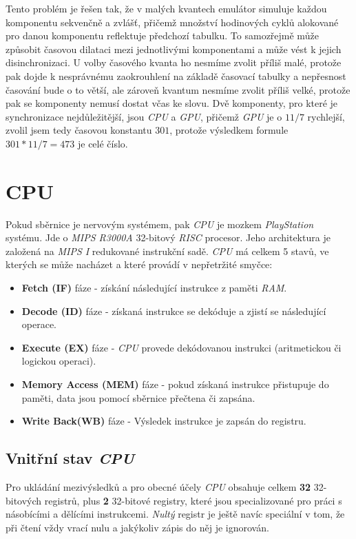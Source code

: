 Tento problém je řešen tak, že v malých kvantech emulátor simuluje každou komponentu sekvenčně a zvlášť,
přičemž množství hodinových cyklů alokované pro danou komponentu reflektuje předchozí tabulku.
To samozřejmě může způsobit časovou dilataci mezi jednotlivými komponentami a může vést k jejich
disinchronizaci. U volby časového kvanta ho nesmíme zvolit příliš malé, protože pak dojde k nesprávnému
zaokrouhlení na základě časovací tabulky a nepřesnost časování bude o to větší, ale zároveň kvantum nesmíme zvolit příliš velké, protože pak
se komponenty nemusí dostat včas ke slovu. Dvě komponenty, pro které je synchronizace nejdůležitější,
jsou \textit{CPU} a \textit{GPU}, přičemž \textit{GPU} je o $11/7$ rychlejší, zvolil jsem tedy časovou konstantu $301$,
protože výsledkem formule $301*11/7=473$ je celé číslo.

\section{CPU}

Pokud sběrnice je nervovým systémem, pak \textit{CPU} je mozkem \textit{PlayStation} systému. Jde
o \textit{MIPS R3000A} 32-bitový \textit{RISC} procesor. Jeho architektura je založená na \textit{MIPS I} redukované instrukční sadě.
\textit{CPU} má celkem 5 stavů, ve kterých se může nacházet a které provádí v nepřetržité smyčce:

\begin{itemize}
    \item{\textbf{Fetch (IF)} fáze - získání následující instrukce z paměti \textit{RAM}.}
    \item{\textbf{Decode (ID)} fáze - získaná instrukce se dekóduje a zjistí se následující operace.}
    \item{\textbf{Execute (EX)} fáze - \textit{CPU} provede dekódovanou instrukci (aritmetickou či logickou operaci).}
    \item{\textbf{Memory Access (MEM)} fáze - pokud získaná instrukce přistupuje do paměti, data jsou pomocí sběrnice přečtena či zapsána.}
    \item{\textbf{Write Back(WB)} fáze - Výsledek instrukce je zapsán do registru.}
\end{itemize}

\subsection{Vnitřní stav \textit{CPU}}

Pro ukládání mezivýsledků a pro obecné účely \textit{CPU} obsahuje celkem \textbf{32} 32-bitových registrů, plus \textbf{2} 32-bitové registry, které
jsou specializované pro práci s násobícími a dělícími instrukcemi. \textit{Nultý} registr je ještě navíc speciální v tom,
že při čtení vždy vrací nulu a jakýkoliv zápis do něj je ignorován.

